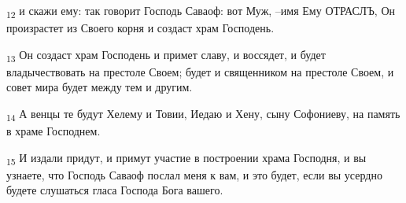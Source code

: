 \begin{tcolorbox}
\textsubscript{12} и скажи ему: так говорит Господь Саваоф: вот Муж, --имя Ему ОТРАСЛЪ, Он произрастет из Своего корня и создаст храм Господень.
\end{tcolorbox}
\begin{tcolorbox}
\textsubscript{13} Он создаст храм Господень и примет славу, и воссядет, и будет владычествовать на престоле Своем; будет и священником на престоле Своем, и совет мира будет между тем и другим.
\end{tcolorbox}
\begin{tcolorbox}
\textsubscript{14} А венцы те будут Хелему и Товии, Иедаю и Хену, сыну Софониеву, на память в храме Господнем.
\end{tcolorbox}
\begin{tcolorbox}
\textsubscript{15} И издали придут, и примут участие в построении храма Господня, и вы узнаете, что Господь Саваоф послал меня к вам, и это будет, если вы усердно будете слушаться гласа Господа Бога вашего.
\end{tcolorbox}
